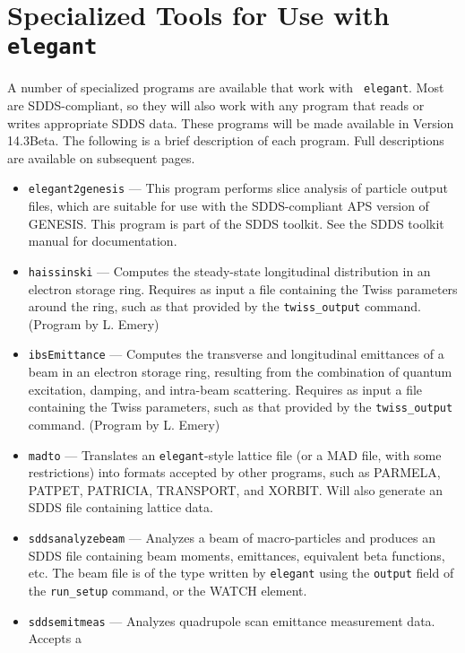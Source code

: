 \documentclass[11pt]{article}
\begin{document}
\newpage
\section{Specialized Tools for Use with {\tt elegant}}

A number of specialized programs are available that work with {\tt
elegant}. Most are SDDS-compliant, so they will also work with any
program that reads or writes appropriate SDDS data.  These programs
will be made available in Version 14.3Beta.  The following is a
brief description of each program.  Full descriptions are available
on subsequent pages.
\begin{itemize}
\item {\tt elegant2genesis} --- This program performs
        slice analysis of particle output files, which are suitable for use with
        the SDDS-compliant APS version of GENESIS\cite{GENESIS}.  This program is
        part of the SDDS toolkit.  See the SDDS toolkit
        manual for documentation.
\item {\tt haissinski} --- Computes the steady-state longitudinal distribution in
        an electron storage ring.  Requires as input a file containing the Twiss
        parameters around the ring, such as that provided by the \verb|twiss_output| command.
        (Program by L. Emery)
\item {\tt ibsEmittance} --- Computes the transverse and longitudinal emittances of a beam in
        an electron storage ring, resulting from the combination of quantum excitation,
        damping, and intra-beam scattering.  Requires as input a file containing the
        Twiss parameters, such as that provided by the \verb|twiss_output| command.
        (Program by L. Emery)
\item {\tt madto} --- Translates an {\tt elegant}-style lattice file (or a MAD file, with
        some restrictions) into formats accepted by other programs, such as PARMELA, 
        PATPET, PATRICIA, TRANSPORT, and XORBIT.  Will also generate an SDDS file containing lattice
        data.
\item {\tt sddsanalyzebeam} --- Analyzes a beam of macro-particles and produces an SDDS file
        containing beam moments, emittances, equivalent beta functions, etc.  The beam file
        is of the type written by {\tt elegant} using the {\tt output} field of the {\tt run\_setup}
        command, or the WATCH element.
\item {\tt sddsemitmeas} --- Analyzes quadrupole scan emittance measurement data.  Accepts a

\end{itemize}
\end{document}
